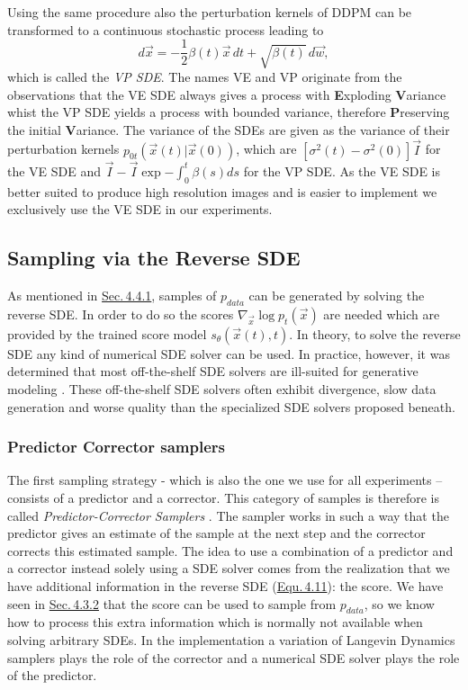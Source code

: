Using the same procedure also the perturbation kernels of DDPM can be transformed to a continuous stochastic process leading to
%
\begin{equation} \label{equ:4.19}
    d\vec{x}=-\frac{1}{2}\beta(t)\vec{x}\,dt+\sqrt{\beta(t)}\,d\vec{w},
\end{equation}
%
which is called the \textit{VP SDE}. The names VE and VP originate from the observations that the VE SDE always gives a process with \textbf{E}xploding \textbf{V}ariance whist the VP SDE yields a process with bounded variance, therefore \textbf{P}reserving the initial \textbf{V}ariance. The variance of the SDEs are given as the variance of their perturbation kernels $p_{0t}(\vec{x}(t)|\vec{x}(0))$, which are $[\sigma^2(t)-\sigma^2(0)]\vec{I}$ for the VE SDE and $\vec{I}-\vec{I}\exp{-\int_0^t\beta(s)ds}$ for the VP SDE. As the VE SDE is better suited to produce high resolution images \cite{score_3} and is easier to implement we exclusively use the VE SDE in our experiments.

\subsection{Sampling via the Reverse SDE}
As mentioned in \hyperref[sec:4.4.1]{Sec.\,4.4.1}, samples of $p_{data}$ can be generated by solving the reverse SDE. In order to do so the scores $\nabla_{\vec{x}}\log p_t(\vec{x})$ are needed which are provided by the trained score model $s_\theta(\vec{x}(t),t)$. In theory, to solve the reverse SDE any kind of numerical SDE solver can be used. In practice, however, it was determined that most off-the-shelf SDE solvers are ill-suited for generative modeling \cite{gotta_go_fast}. These off-the-shelf SDE solvers often exhibit divergence, slow data generation and worse quality than the specialized SDE solvers proposed beneath.

\subsubsection{Predictor Corrector samplers}
The first sampling strategy - which is also the one we use for all experiments – consists of a predictor and a corrector. This category of samples is therefore is called \textit{Predictor-Corrector Samplers} \cite{score_3}. The sampler works in such a way that the predictor gives an estimate of the sample at the next step and the corrector corrects this estimated sample. The idea to use a combination of a predictor and a corrector instead solely using a SDE solver comes from the realization that we have additional information in the reverse SDE (\hyperref[equ:4.11]{Equ.\,4.11}): the score. We have seen in \hyperref[sec:4.3.2]{Sec.\,4.3.2} that the score can be used to sample from $p_{data}$, so we know how to process this extra information which is normally not available when solving arbitrary SDEs. In the implementation a variation of Langevin Dynamics samplers plays the role of the corrector and a numerical SDE solver plays the role of the predictor.

